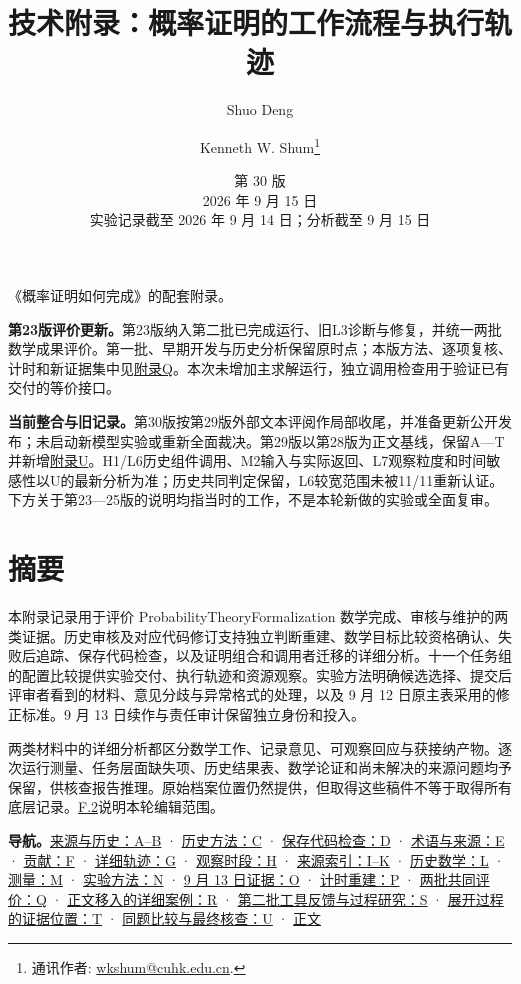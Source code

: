 
\title{技术附录：概率证明的工作流程与执行轨迹}
\author{Shuo Deng \and Kenneth W. Shum\thanks{通讯作者: \href{mailto:wkshum@cuhk.edu.cn}{wkshum@cuhk.edu.cn}.}}\date{第 30 版\\2026 年 9 月 15 日\\实验记录截至 2026 年 9 月 14 日；分析截至 9 月 15 日}
\maketitle
《概率证明如何完成》的配套附录。

\textbf{第23版评价更新。}第23版纳入第二批已完成运行、旧L3诊断与修复，并统一两批数学成果评价。第一批、早期开发与历史分析保留原时点；本版方法、逐项复核、计时和新证据集中见\hyperlink{appendix-q}{附录Q}。本次未增加主求解运行，独立调用检查用于验证已有交付的等价接口。

\textbf{当前整合与旧记录。}第30版按第29版外部文本评阅作局部收尾，并准备更新公开发布；未启动新模型实验或重新全面裁决。第29版以第28版为正文基线，保留A—T并新增\hyperlink{appendix-u}{附录U}。H1/L6历史组件调用、M2输入与实际返回、L7观察粒度和时间敏感性以U的最新分析为准；历史共同判定保留，L6较宽范围未被11/11重新认证。下方关于第23—25版的说明均指当时的工作，不是本轮新做的实验或全面复审。

\section*{\texorpdfstring{\protect\hypertarget{abstract}{}摘要}{摘要}}
本附录记录用于评价 ProbabilityTheoryFormalization 数学完成、审核与维护的两类证据。历史审核及对应代码修订支持独立判断重建、数学目标比较资格确认、失败后追踪、保存代码检查，以及证明组合和调用者迁移的详细分析。十一个任务组的配置比较提供实验交付、执行轨迹和资源观察。实验方法明确候选选择、提交后评审者看到的材料、意见分歧与异常格式的处理，以及 9 月 12 日原主表采用的修正标准。9 月 13 日续作与责任审计保留独立身份和投入。

两类材料中的详细分析都区分数学工作、记录意见、可观察回应与获接纳产物。逐次运行测量、任务层面缺失项、历史结果表、数学论证和尚未解决的来源问题均予保留，供核查报告推理。原始档案位置仍然提供，但取得这些稿件不等于取得所有底层记录。\hyperlink{f2}{F.2}说明本轮编辑范围。

\textbf{导航。}\hyperlink{appendix-a}{来源与历史：A–B} · \hyperlink{appendix-c}{历史方法：C} · \hyperlink{appendix-d}{保存代码检查：D} · \hyperlink{appendix-e}{术语与来源：E} · \hyperlink{appendix-f}{贡献：F} · \hyperlink{appendix-g}{详细轨迹：G} · \hyperlink{appendix-h}{观察时段：H} · \hyperlink{appendix-i}{来源索引：I–K} · \hyperlink{appendix-l}{历史数学：L} · \hyperlink{appendix-m}{测量：M} · \hyperlink{appendix-n}{实验方法：N} · \hyperlink{appendix-o}{9 月 13 日证据：O} · \hyperlink{appendix-p}{计时重建：P} · \hyperlink{appendix-q}{两批共同评价：Q} · \hyperlink{appendix-r}{正文移入的详细案例：R} · \hyperlink{appendix-s}{第二批工具反馈与过程研究：S} · \hyperlink{appendix-t}{展开过程的证据位置：T} · \hyperlink{appendix-u}{同题比较与最终核查：U} · \href{zh.pdf}{正文}

